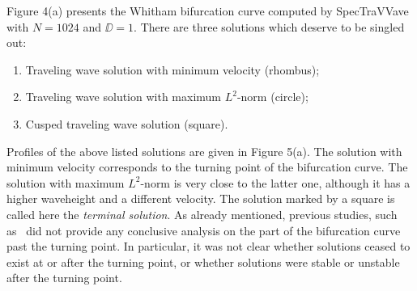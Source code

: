 Figure 4(a) %
presents the Whitham bifurcation curve computed by \textsf{SpecTraVVave} 
with $N=1024$ and $\DD=1$. 
There are three solutions which deserve to be singled out:
\begin{enumerate}
	\item Traveling wave solution with minimum velocity (rhombus);
	\item Traveling wave solution with maximum $L^2$-norm (circle);
	\item Cusped traveling wave solution (square).
\end{enumerate}
Profiles of the above listed solutions are given in Figure 5(a).
The solution with minimum velocity corresponds to the turning point of the bifurcation curve.
The solution with maximum $L^2$-norm is very close to the latter one, although it has a higher waveheight 
and a different velocity.
The solution marked by a square is called here the \emph{terminal solution}.
As already mentioned, previous studies, such as~\cite{Ehrnstrom2009,Ehrnstrom2013} did not provide any conclusive
analysis on the part of the bifurcation curve past the turning point.
In particular, it was not clear whether solutions ceased to exist
at or after the turning point, or whether solutions were stable
or unstable after the turning point. 

